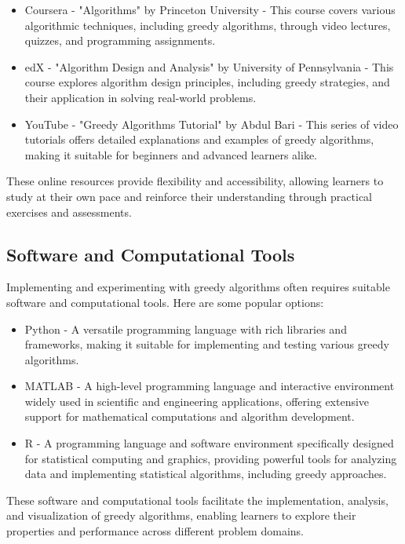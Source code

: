 \documentclass[12pt]{book} %
\begin{document}
\begin{itemize}
    \item Coursera - "Algorithms" by Princeton University - This course covers various algorithmic techniques, including greedy algorithms, through video lectures, quizzes, and programming assignments.
    \item edX - "Algorithm Design and Analysis" by University of Pennsylvania - This course explores algorithm design principles, including greedy strategies, and their application in solving real-world problems.
    \item YouTube - "Greedy Algorithms Tutorial" by Abdul Bari - This series of video tutorials offers detailed explanations and examples of greedy algorithms, making it suitable for beginners and advanced learners alike.
\end{itemize}

These online resources provide flexibility and accessibility, allowing learners to study at their own pace and reinforce their understanding through practical exercises and assessments.

\subsection{Software and Computational Tools}
Implementing and experimenting with greedy algorithms often requires suitable software and computational tools. Here are some popular options:

\begin{itemize}
    \item Python - A versatile programming language with rich libraries and frameworks, making it suitable for implementing and testing various greedy algorithms.
    \item MATLAB - A high-level programming language and interactive environment widely used in scientific and engineering applications, offering extensive support for mathematical computations and algorithm development.
    \item R - A programming language and software environment specifically designed for statistical computing and graphics, providing powerful tools for analyzing data and implementing statistical algorithms, including greedy approaches.
\end{itemize}

These software and computational tools facilitate the implementation, analysis, and visualization of greedy algorithms, enabling learners to explore their properties and performance across different problem domains.
\end{document}
